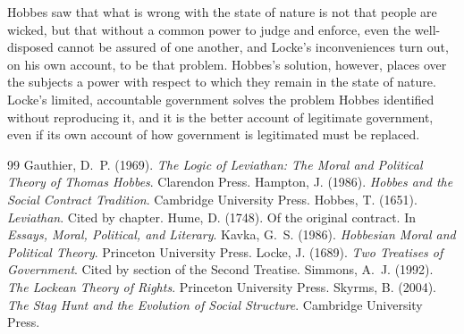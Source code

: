 \documentclass{situationist-preprint}
\begin{document}
Hobbes saw that what is wrong with the state of nature is not that people are wicked, but that without a common power to judge and enforce, even the well-disposed cannot be assured of one another, and Locke's inconveniences turn out, on his own account, to be that problem. Hobbes's solution, however, places over the subjects a power with respect to which they remain in the state of nature. Locke's limited, accountable government solves the problem Hobbes identified without reproducing it, and it is the better account of legitimate government, even if its own account of how government is legitimated must be replaced.

\begin{thebibliography}{99}\small
{} Gauthier, D.~P. (1969). \emph{The Logic of Leviathan: The Moral and Political Theory of Thomas Hobbes}. Clarendon Press.
 Hampton, J. (1986). \emph{Hobbes and the Social Contract Tradition}. Cambridge University Press.
 Hobbes, T. (1651). \emph{Leviathan}. Cited by chapter.
 Hume, D. (1748). Of the original contract. In \emph{Essays, Moral, Political, and Literary}.
 Kavka, G.~S. (1986). \emph{Hobbesian Moral and Political Theory}. Princeton University Press.
 Locke, J. (1689). \emph{Two Treatises of Government}. Cited by section of the Second Treatise.
 Simmons, A.~J. (1992). \emph{The Lockean Theory of Rights}. Princeton University Press.
 Skyrms, B. (2004). \emph{The Stag Hunt and the Evolution of Social Structure}. Cambridge University Press.
\end{thebibliography}
\end{document}
